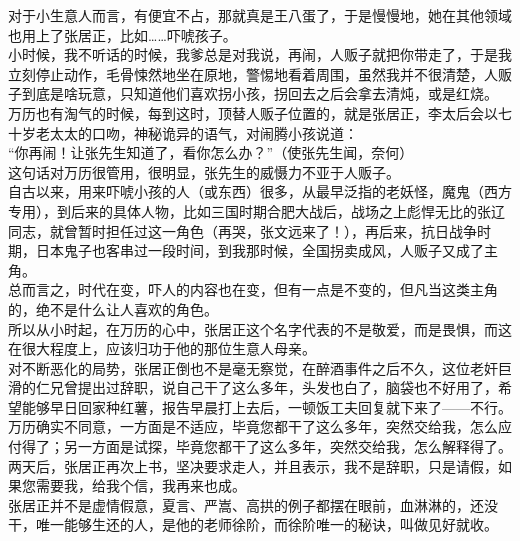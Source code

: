 \begin{multicols}{\theparacolNo}
对于小生意人而言，有便宜不占，那就真是王八蛋了，于是慢慢地，她在其他领域也用上了张居正，比如……吓唬孩子。\\

小时候，我不听话的时候，我爹总是对我说，再闹，人贩子就把你带走了，于是我立刻停止动作，毛骨悚然地坐在原地，警惕地看着周围，虽然我并不很清楚，人贩子到底是啥玩意，只知道他们喜欢拐小孩，拐回去之后会拿去清炖，或是红烧。\\

万历也有淘气的时候，每到这时，顶替人贩子位置的，就是张居正，李太后会以七十岁老太太的口吻，神秘诡异的语气，对闹腾小孩说道：\\

“你再闹！让张先生知道了，看你怎么办？”（使张先生闻，奈何）\\

这句话对万历很管用，很明显，张先生的威慑力不亚于人贩子。\\

自古以来，用来吓唬小孩的人（或东西）很多，从最早泛指的老妖怪，魔鬼（西方专用），到后来的具体人物，比如三国时期合肥大战后，战场之上彪悍无比的张辽同志，就曾暂时担任过这一角色（再哭，张文远来了！），再后来，抗日战争时期，日本鬼子也客串过一段时间，到我那时候，全国拐卖成风，人贩子又成了主角。\\

总而言之，时代在变，吓人的内容也在变，但有一点是不变的，但凡当这类主角的，绝不是什么让人喜欢的角色。\\

所以从小时起，在万历的心中，张居正这个名字代表的不是敬爱，而是畏惧，而这在很大程度上，应该归功于他的那位生意人母亲。\\

对不断恶化的局势，张居正倒也不是毫无察觉，在醉酒事件之后不久，这位老奸巨滑的仁兄曾提出过辞职，说自己干了这么多年，头发也白了，脑袋也不好用了，希望能够早日回家种红薯，报告早晨打上去后，一顿饭工夫回复就下来了——不行。\\

万历确实不同意，一方面是不适应，毕竟您都干了这么多年，突然交给我，怎么应付得了；另一方面是试探，毕竟您都干了这么多年，突然交给我，怎么解释得了。\\

两天后，张居正再次上书，坚决要求走人，并且表示，我不是辞职，只是请假，如果您需要我，给我个信，我再来也成。\\

张居正并不是虚情假意，夏言、严嵩、高拱的例子都摆在眼前，血淋淋的，还没干，唯一能够生还的人，是他的老师徐阶，而徐阶唯一的秘诀，叫做见好就收。\\


\end{multicols}

